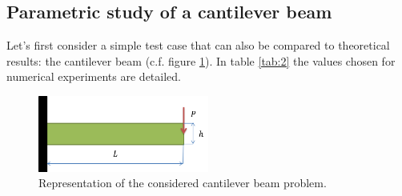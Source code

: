 \subsection{Parametric study of a cantilever beam}
\label{CB}
Let's first consider a simple test case that can also be compared to theoretical results: the cantilever beam (c.f. figure \ref{fig:cb}).
In table \ref{tab:2} the values chosen for numerical experiments are detailed.
\begin{figure}[!h]
\centering
  \includegraphics[width=0.5\textwidth]{images/Ch3/Cantilever_beam.png}
\caption{Representation of the considered cantilever beam problem.}
\label{fig:cb}       %
\end{figure}
